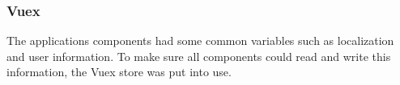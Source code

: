 \subsubsection{Vuex}
The applications components had some common variables such as localization and user information. To make sure all components could read and write this information, the Vuex store was put into use.
